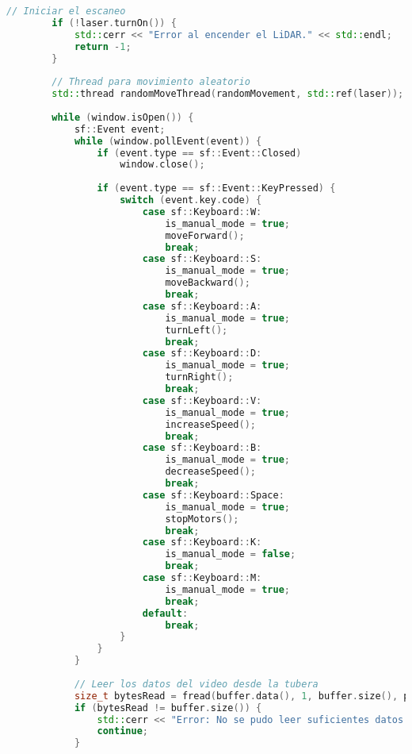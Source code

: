 \begin{lstlisting}[language={C++}, caption={Primer ajuste de c\'odigo}, label={Script}]
        // Iniciar el escaneo
        if (!laser.turnOn()) {
            std::cerr << "Error al encender el LiDAR." << std::endl;
            return -1;
        }
    
        // Thread para movimiento aleatorio
        std::thread randomMoveThread(randomMovement, std::ref(laser));
    
        while (window.isOpen()) {
            sf::Event event;
            while (window.pollEvent(event)) {
                if (event.type == sf::Event::Closed)
                    window.close();
    
                if (event.type == sf::Event::KeyPressed) {
                    switch (event.key.code) {
                        case sf::Keyboard::W:
                            is_manual_mode = true;
                            moveForward();
                            break;
                        case sf::Keyboard::S:
                            is_manual_mode = true;
                            moveBackward();
                            break;
                        case sf::Keyboard::A:
                            is_manual_mode = true;
                            turnLeft();
                            break;
                        case sf::Keyboard::D:
                            is_manual_mode = true;
                            turnRight();
                            break;
                        case sf::Keyboard::V:
                            is_manual_mode = true;
                            increaseSpeed();
                            break;
                        case sf::Keyboard::B:
                            is_manual_mode = true;
                            decreaseSpeed();
                            break;
                        case sf::Keyboard::Space:
                            is_manual_mode = true;
                            stopMotors();
                            break;
                        case sf::Keyboard::K:
                            is_manual_mode = false;
                            break;
                        case sf::Keyboard::M:
                            is_manual_mode = true;
                            break;
                        default:
                            break;
                    }
                }
            }
    
            // Leer los datos del video desde la tubera
            size_t bytesRead = fread(buffer.data(), 1, buffer.size(), pipe);
            if (bytesRead != buffer.size()) {
                std::cerr << "Error: No se pudo leer suficientes datos de video." << std::endl;
                continue;
            }
    

\end{lstlisting}
